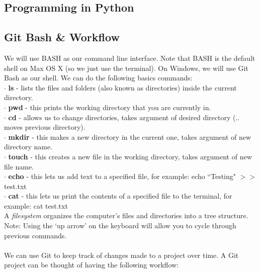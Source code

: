 \documentclass[11pt, a4paper]{article}
\begin{document}
\begin{spacing}{1.1}
	\section{Programming in Python}
	\subsection{Git Bash \& Workflow}
	We will use BASH as our command line interface. Note that BASH is the default shell on Max OS X (so we just use the terminal). On Windows, we will use Git Bash as our shell. We can do the following basics commands: \vspace*{1mm} \\
	\hspace*{1.5mm} $\cdot$ \textbf{ls} - lists the files and folders (also known as directories) inside the current directory. \\
	\hspace*{1.5mm} $\cdot$ \textbf{pwd} - this prints the working directory that you are currently in. \\
	\hspace*{1.5mm} $\cdot$ \textbf{cd} - allows us to change directories, takes argument of desired directory (.. moves previous directory). \\
	\hspace*{1.5mm} $\cdot$ \textbf{mkdir} - this makes a new directory in the current one, takes argument of new directory name. \\
	\hspace*{1.5mm} $\cdot$ \textbf{touch} - this creates a new file in the working directory, takes argument of new file name. \\
	\hspace*{1.5mm} $\cdot$ \textbf{echo} - this lets us add text to a specified file, for example: echo ``Testing" $>>$ test.txt \\
	\hspace*{1.5mm} $\cdot$ \textbf{cat} - this lets us print the contents of a specified file to the terminal, for example: cat test.txt \vspace*{2mm}\\
	A \textit{filesystem} organizes the computer's files and directories into a tree structure. \\
	Note: Using the `up arrow' on the keyboard will allow you to cycle through previous commands. \\~\\
	We can use Git to keep track of changes made to a project over time. A Git project can be thought of having the following workflow: \vspace*{1mm} \\

\end{spacing}
\end{document}
